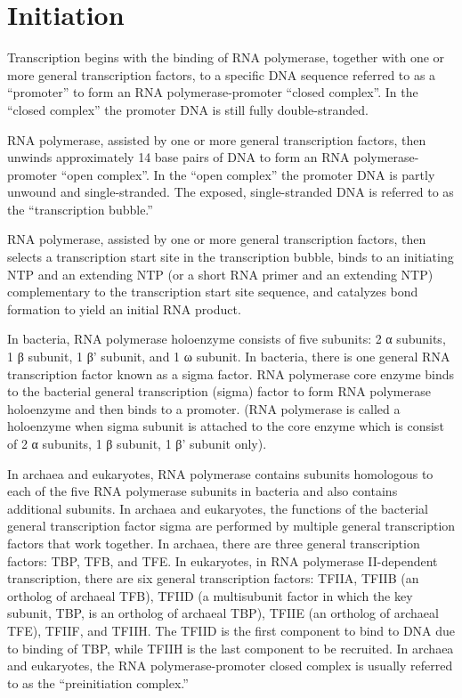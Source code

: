 \hypertarget{initiation-2}{%
\section{Initiation}\label{initiation-2}}

Transcription begins with the binding of RNA polymerase, together with one or more general transcription factors, to a specific DNA sequence referred to as a ``promoter'' to form an RNA polymerase-promoter ``closed complex''. In the ``closed complex'' the promoter DNA is still fully double-stranded.

RNA polymerase, assisted by one or more general transcription factors, then unwinds approximately 14 base pairs of DNA to form an RNA polymerase-promoter ``open complex''. In the ``open complex'' the promoter DNA is partly unwound and single-stranded. The exposed, single-stranded DNA is referred to as the ``transcription bubble.''

RNA polymerase, assisted by one or more general transcription factors, then selects a transcription start site in the transcription bubble, binds to an initiating NTP and an extending NTP (or a short RNA primer and an extending NTP) complementary to the transcription start site sequence, and catalyzes bond formation to yield an initial RNA product.

In bacteria, RNA polymerase holoenzyme consists of five subunits: 2 α subunits, 1 β subunit, 1 β' subunit, and 1 ω subunit. In bacteria, there is one general RNA transcription factor known as a sigma factor. RNA polymerase core enzyme binds to the bacterial general transcription (sigma) factor to form RNA polymerase holoenzyme and then binds to a promoter. (RNA polymerase is called a holoenzyme when sigma subunit is attached to the core enzyme which is consist of 2 α subunits, 1 β subunit, 1 β' subunit only).

In archaea and eukaryotes, RNA polymerase contains subunits homologous to each of the five RNA polymerase subunits in bacteria and also contains additional subunits. In archaea and eukaryotes, the functions of the bacterial general transcription factor sigma are performed by multiple general transcription factors that work together. In archaea, there are three general transcription factors: TBP, TFB, and TFE. In eukaryotes, in RNA polymerase II-dependent transcription, there are six general transcription factors: TFIIA, TFIIB (an ortholog of archaeal TFB), TFIID (a multisubunit factor in which the key subunit, TBP, is an ortholog of archaeal TBP), TFIIE (an ortholog of archaeal TFE), TFIIF, and TFIIH. The TFIID is the first component to bind to DNA due to binding of TBP, while TFIIH is the last component to be recruited. In archaea and eukaryotes, the RNA polymerase-promoter closed complex is usually referred to as the ``preinitiation complex.''

